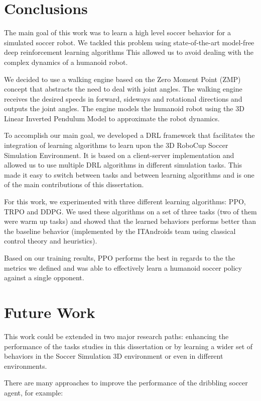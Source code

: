 \section{Conclusions}

The main goal of this work was to learn a high level soccer behavior for a simulated soccer robot.
We tackled this problem using state-of-the-art model-free deep reinforcement learning algorithms
This allowed us to avoid dealing with the complex dynamics of a humanoid robot.

We decided to use a walking engine based on the Zero Moment Point (ZMP) concept that abstracts the need to deal with joint angles.
The walking engine receives the desired speeds in forward, sideways and rotational directions and outputs
the joint angles. The engine models the humanoid robot using the 3D Linear Inverted Pendulum Model to 
approximate the robot dynamics.

To accomplish our main goal, we developed a DRL framework that facilitates the integration of learning
algorithms to learn upon the 3D RoboCup Soccer Simulation Environment. It is based on a client-server implementation and
allowed us to use multiple DRL algorithms in different simulation tasks.
This made it easy to switch between tasks and between learning algorithms and is one of the main 
contributions of this dissertation.

For this work, we experimented with three different learning algorithms: PPO, TRPO and DDPG.
We used these algorithms on a set of three tasks (two of them were warm up tasks) and showed that the 
learned behaviors performs better than the baseline behavior (implemented by the ITAndroids team using
classical control theory and heuristics).

Based on our training results, PPO performs the best in regards to the the metrics we defined and was
able to effectively learn a humanoid soccer policy against a single opponent.

\section{Future Work}

This work could be extended in two major research paths:
 enhancing the performance of the tasks studies in this dissertation or by
learning a wider set of behaviors in the Soccer Simulation 3D environment or even in different environments.

There are many approaches to improve the performance of the dribbling soccer agent, for example:

